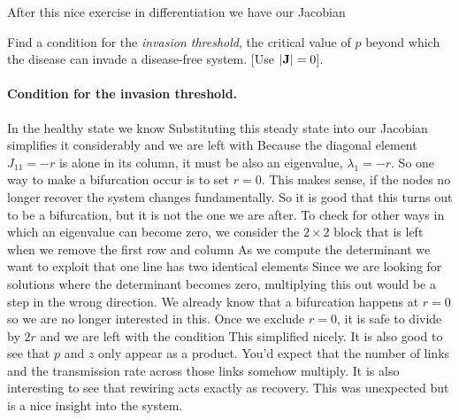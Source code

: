 After this nice exercise in differentiation we have our Jacobian 

\subquestion Find a condition for the \textit{invasion threshold}, the critical value of $p$ beyond which the  disease can invade a disease-free system. [Use $|{\bf J}|=0$].

\solution 
\paragraph{Condition for the invasion threshold.}In the healthy state we know
Substituting this steady state into our Jacobian simplifies it considerably and we are left with
Because the diagonal element $J_{11}=-r$ is alone in its column, it must be also an eigenvalue,  $\lambda_1=-r$. So one way to make a bifurcation occur is to set $r=0$. This makes sense, if the nodes no longer recover the system changes fundamentally. So it is good that this turns out to be a bifurcation, but it is not the one we are after. To check for other ways in which an eigenvalue can become zero, we consider the $2\times 2$ block that is left when we remove the first row and column
As we compute the determinant we want to exploit that one line has two identical elements
Since we are looking for solutions where the determinant becomes zero, multiplying this out would be a step in the wrong direction. We already know that a bifurcation happens at $r=0$ so we are no longer interested in this. Once we exclude $r=0$, it is safe to divide by $2r$ and we are left with the condition 
This simplified nicely. It is also good to see that $p$ and $z$ only appear as a product. You'd expect that the number of links and the transmission rate across those links somehow multiply. It is also interesting to see that rewiring acts exactly as recovery. This was unexpected but is a nice insight into the system. 

